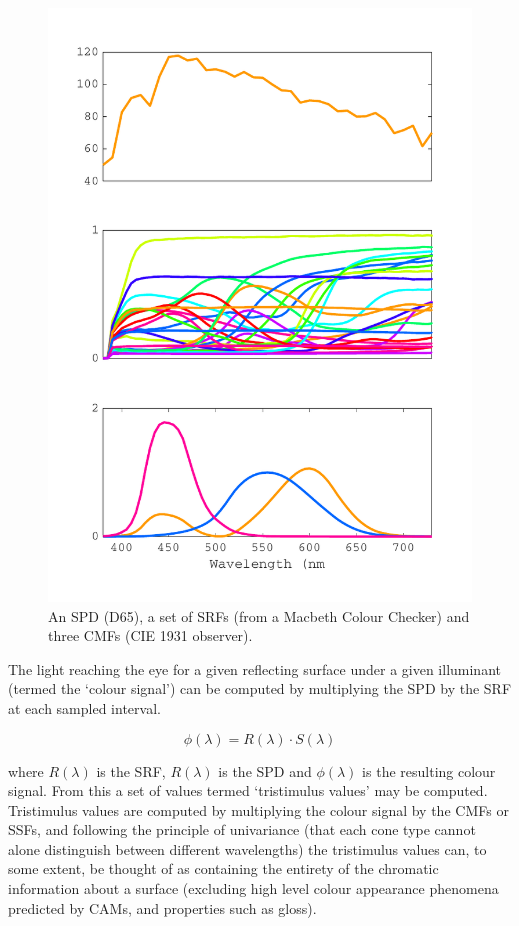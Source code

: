 \begin{figure}[htbp]
\includegraphics[max width=\textwidth]{figs/LitRev/SPDetc.pdf}
\caption{An \gls{SPD} (D65), a set of \glspl{SRF} (from a Macbeth Colour Checker) and three \glspl{CMF} (\gls{CIE} 1931 observer).}
\label{fig:specFun}
\end{figure}

The light reaching the eye for a given reflecting surface under a given illuminant (termed the `colour signal') can be computed by multiplying the \gls{SPD} by the \gls{SRF} at each sampled interval.

\begin{equation}
\phi(\lambda)=R(\lambda) \cdot S(\lambda)
\end{equation}

where $R(\lambda)$ is the \gls{SRF}, $R(\lambda)$ is the \gls{SPD} and $\phi(\lambda)$ is the resulting colour signal. From this a set of values termed `tristimulus values' may be computed. Tristimulus values are computed by multiplying the colour signal by the \glspl{CMF} or \glspl{SSF}, and following the principle of univariance (that each cone type cannot alone distinguish between different wavelengths) the tristimulus values can, to some extent, be thought of as containing the entirety of the chromatic information about a surface (excluding high level colour appearance phenomena predicted by \Glspl{CAM}, and properties such as gloss).

